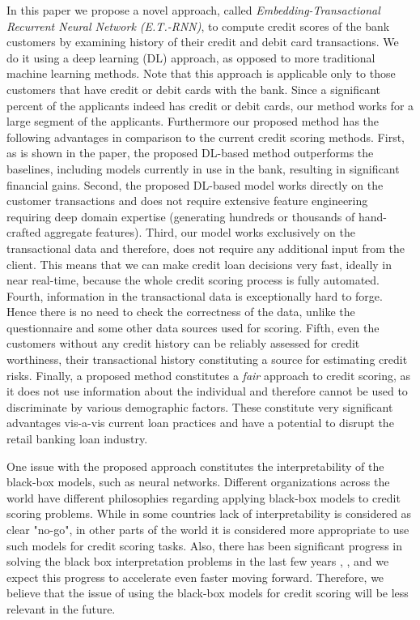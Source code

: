 \documentclass[sigconf]{acmart}
\begin{document}
In this paper we propose a novel approach, called \textit{Embedding-Transactional Recurrent Neural Network (E.T.-RNN)}, to compute credit scores of the bank customers by examining history of their credit and debit card transactions.
We do it using a deep learning (DL) approach, as opposed to more traditional machine learning methods.
Note that this approach is applicable only to those customers that have credit or debit cards with the bank. Since a significant percent of the applicants indeed has credit or debit cards, our method works for a large segment of the applicants. Furthermore our proposed method has the following advantages in comparison to the current credit scoring methods.
First, as is shown in the paper, the proposed DL-based method outperforms the baselines, including models currently in use in the bank, resulting in significant financial gains.
Second, the proposed DL-based model works directly on the customer transactions and does not require extensive feature engineering requiring deep domain expertise (generating hundreds or thousands of hand-crafted aggregate features).
Third, our model works exclusively on the transactional data and therefore, does not require any additional input from the client. This means that we can make credit loan decisions very fast, ideally in near real-time, because the whole credit scoring process is fully automated.
Fourth, information in the transactional data is exceptionally hard to forge. Hence there is no need to check the correctness of the data, unlike the questionnaire and some other data sources used for scoring.
Fifth, even the customers without any credit history can be reliably assessed for credit worthiness, their transactional history constituting a source for estimating credit risks.
Finally, a proposed method  constitutes a \textit{fair} approach to credit scoring, as it does not use information about the individual and therefore cannot be used to discriminate by various demographic factors.
These constitute very significant advantages vis-a-vis current loan practices and have a potential to disrupt the retail banking loan industry.

One issue with the proposed approach constitutes the interpretability of the black-box models, such as neural networks.
Different organizations across the world have different philosophies regarding applying black-box models to credit scoring problems. While in some countries lack of interpretability is considered as clear "no-go", in other parts of the world it is considered more appropriate to use such models for credit scoring tasks. Also, there has been significant progress in solving the black box interpretation problems in the last few years \cite{DBLP:journals/corr/ChoiBSSS16}, \cite{gupta2018lisa}, \cite{mccoy2018rnns} and we expect this progress to accelerate even faster moving forward. Therefore, we believe that the issue of using the black-box models for credit scoring will be less relevant in the future.
\end{document}
